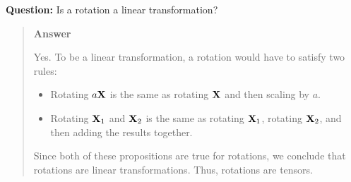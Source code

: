 \documentclass[
  letterpaper,
  DIV=11,
  numbers=noendperiod]{scrreprt}
\begin{document}
\begin{tcolorbox}[enhanced jigsaw, arc=.35mm, bottomrule=.15mm, bottomtitle=1mm, breakable, colback=white, colbacktitle=quarto-callout-tip-color!10!white, colframe=quarto-callout-tip-color-frame, coltitle=black, left=2mm, leftrule=.75mm, opacityback=0, opacitybacktitle=0.6, rightrule=.15mm, title=\textcolor{quarto-callout-tip-color}{\faLightbulb}\hspace{0.5em}{Think!}, titlerule=0mm, toprule=.15mm, toptitle=1mm]

\textbf{Question:} Is a rotation a linear transformation?

\begin{quote}
\textbf{Answer}

Yes. To be a linear transformation, a rotation would have to satisfy two
rules:

\begin{itemize}
\item
  Rotating \(a{\bf X}\) is the same as rotating \({\bf X}\) and then
  scaling by \(a\).
\item
  Rotating \({\bf X}_1\) and \({\bf X}_2\) is the same as rotating
  \({\bf X}_1\), rotating \({\bf X}_2\), and then adding the results
  together.
\end{itemize}

Since both of these propositions are true for rotations, we conclude
that rotations are linear transformations. Thus, rotations are tensors.
\end{quote}

\end{tcolorbox}
\end{document}
